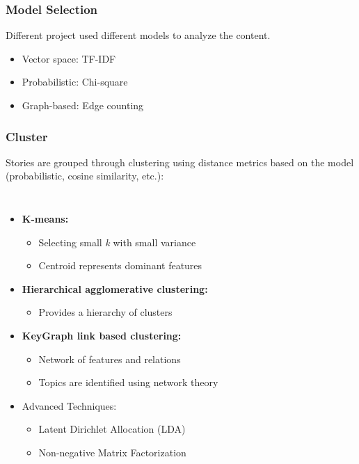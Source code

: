 \documentclass{beamer}
\begin{document}
\begin{frame}
	\frametitle{Model Selection}
	Different project used different models to analyze the content.
	\begin{itemize}
		\item Vector space: TF-IDF %
		\item Probabilistic: Chi-square %
		\item Graph-based: Edge counting %
	\end{itemize}
\end{frame}
\begin{frame}
	\frametitle{Cluster}
	Stories are grouped through clustering using distance metrics based on the
	model (probabilistic, cosine similarity, etc.):
	\begin{columns}[c]
		\column{3in}
		\begin{itemize}
			\item {\bf K-means:}
				\begin{itemize}
					\item Selecting small \emph{k} with small variance
					\item Centroid represents dominant features
				\end{itemize}
			\item {\bf Hierarchical agglomerative clustering:}
				\begin{itemize}
					\item Provides a hierarchy of clusters 
				\end{itemize}
			\item {\bf KeyGraph link based clustering:}
				\begin{itemize}
					\item Network of features and relations
					\item Topics are identified using network theory
				\end{itemize}
			\item Advanced Techniques:
				\begin{itemize}
					\item Latent Dirichlet Allocation (LDA)
					\item Non-negative Matrix Factorization
				\end{itemize}
		\end{itemize}
		\column{1in}

\end{columns}
\end{frame}
\end{document}
